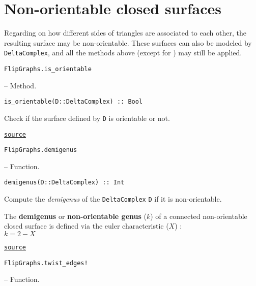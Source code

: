 \section{Non-orientable closed surfaces}



\label{10870430378047419872}{}


Regarding on how different sides of triangles are associated to each other, the resulting surface may be non-orientable. These surfaces can also be modeled by \texttt{DeltaComplex}, and all the methods above (except for ) may still be applied.


\hypertarget{15427213162715270496}{\texttt{FlipGraphs.is\_orientable}}  -- {Method.}

\begin{adjustwidth}{2em}{0pt}


\begin{verbatim}
is_orientable(D::DeltaComplex) :: Bool
\end{verbatim}

Check if the surface defined by \texttt{D} is orientable or not.



\href{https://github.com/schto223/FlipGraphs.jl/blob/490c01a7adf74b42f27dda05099165c47ae8133e/src/deltaComplex.jl#L995-L999}{\texttt{source}}


\end{adjustwidth}
\hypertarget{9818394393198899675}{\texttt{FlipGraphs.demigenus}}  -- {Function.}

\begin{adjustwidth}{2em}{0pt}


\begin{verbatim}
demigenus(D::DeltaComplex) :: Int
\end{verbatim}

Compute the \emph{demigenus} of the \texttt{DeltaComplex} \texttt{D} if it is non-orientable.

The \textbf{demigenus} or \textbf{non-orientable genus} (\(k\)) of a connected non-orientable closed surface is defined via the euler characteristic (\(X\)) :\\
\(k = 2 - X\)



\href{https://github.com/schto223/FlipGraphs.jl/blob/490c01a7adf74b42f27dda05099165c47ae8133e/src/deltaComplex.jl#L392-L399}{\texttt{source}}


\end{adjustwidth}
\hypertarget{17066969119815195638}{\texttt{FlipGraphs.twist\_edges!}}  -- {Function.}

